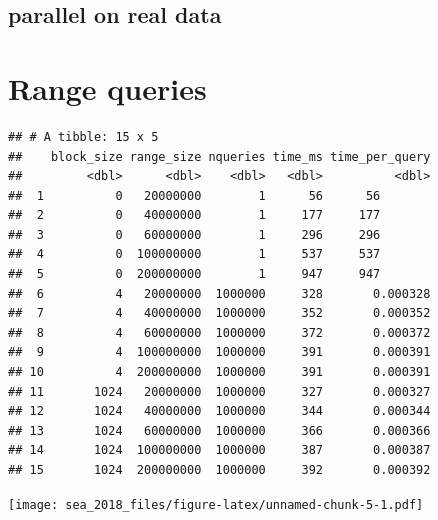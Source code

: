 \documentclass[]{article}
\begin{document}
\subsection{parallel on real data}\label{parallel-on-real-data}

\section{Range queries}\label{range-queries}

\begin{verbatim}
## # A tibble: 15 x 5
##    block_size range_size nqueries time_ms time_per_query
##         <dbl>      <dbl>    <dbl>   <dbl>          <dbl>
##  1          0   20000000        1      56      56       
##  2          0   40000000        1     177     177       
##  3          0   60000000        1     296     296       
##  4          0  100000000        1     537     537       
##  5          0  200000000        1     947     947       
##  6          4   20000000  1000000     328       0.000328
##  7          4   40000000  1000000     352       0.000352
##  8          4   60000000  1000000     372       0.000372
##  9          4  100000000  1000000     391       0.000391
## 10          4  200000000  1000000     391       0.000391
## 11       1024   20000000  1000000     327       0.000327
## 12       1024   40000000  1000000     344       0.000344
## 13       1024   60000000  1000000     366       0.000366
## 14       1024  100000000  1000000     387       0.000387
## 15       1024  200000000  1000000     392       0.000392
\end{verbatim}

\texttt{[image: sea\_2018\_files/figure-latex/unnamed-chunk-5-1.pdf]}
\end{document}
